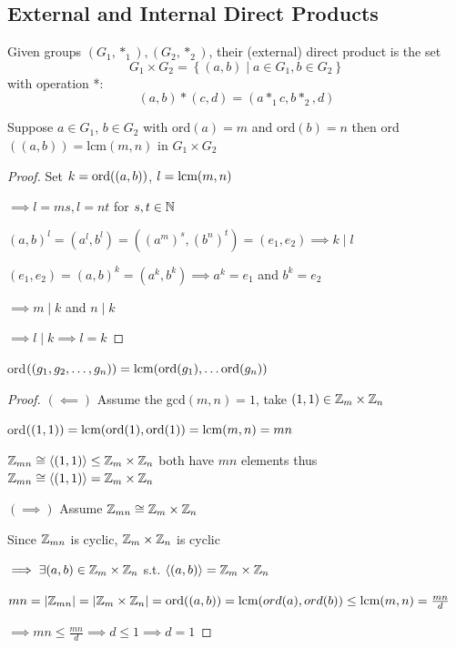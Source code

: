 \subsection{External and Internal Direct Products}

\begin{definition}
    Given groups $(G_1,*_1),(G_2,*_2)$, their (external)
    direct product is the set
    \[G_1\times G_2=\left\{ (a,b) \mid a \in G_1, b\in G_2 \right\}\]
    with operation *:
    \[(a,b)*(c,d)=(a*_1c,b*_2,d)\]
\end{definition}

\begin{proposition}
    Suppose $a\in G_1$, $b\in G_2$ with ord$(a)=m$ and
    ord$(b)=n$ then ord$((a,b))=$lcm$(m,n)$ in $G_1\times G_2$
\end{proposition}

\begin{proof}
    Set $k=\text{ord}((a,b))$, $l=\text{lcm}(m,n)$

    $\implies l=ms, l=nt$ for $s,t\in \mathbb{N}$

    $(a,b)^l=(a^l,b^l)=((a^m)^s,(b^n)^t)=(e_1,e_2) 
    \implies k \mid l$

    $(e_1,e_2)=(a,b)^k=(a^k,b^k) 
    \implies a^k=e_1$ and $b^k=e_2$

    $\implies m \mid k$ and $n \mid k$

    $\implies l \mid k \implies l = k$
\end{proof}

\begin{corollary}
    ord$((g_1,g_2,\dots,g_n))=\text{lcm}(\text{ord}(g_1),\dots\text{ord}(g_n))$
\end{corollary}


\begin{proof}
    $(\impliedby)$ Assume the gcd$(m,n)=1$, 
    take $(1,1)\in \mathbb{Z}_m\times\mathbb{Z}_n$

    ord$((1,1))=\text{lcm}(\text{ord}(1),\text{ord}(1))=\text{lcm}(m,n)=mn$

    $\mathbb{Z}_{mn}\cong\left\langle (1,1) \right\rangle\leq\mathbb{Z}_m\times\mathbb{Z}_n$ both have $mn$ elements
    thus $\mathbb{Z}_{mn}\cong\left\langle (1,1) \right\rangle=\mathbb{Z}_m\times\mathbb{Z}_n$

    $(\implies)$ Assume $\mathbb{Z}_{mn}\cong\mathbb{Z}_m\times\mathbb{Z}_n$

    Since $\mathbb{Z}_{mn}$ is cyclic, $\mathbb{Z}_m\times\mathbb{Z}_n$ is cyclic

    $\implies \exists(a,b)\in \mathbb{Z}_m\times\mathbb{Z}_n$ s.t. 
    $\left\langle (a,b) \right\rangle=\mathbb{Z}_m\times\mathbb{Z}_n$

    $mn=|\mathbb{Z}_{mn}|=|\mathbb{Z}_m\times\mathbb{Z}_n|=\text{ord}((a,b))=\text{lcm}(ord(a),ord(b))
    \leq \text{lcm}(m,n)=\frac{mn}{d}$ 
    
    $\implies mn\leq \frac{mn}{d} \implies d \leq 1 \implies d = 1$
\end{proof}

